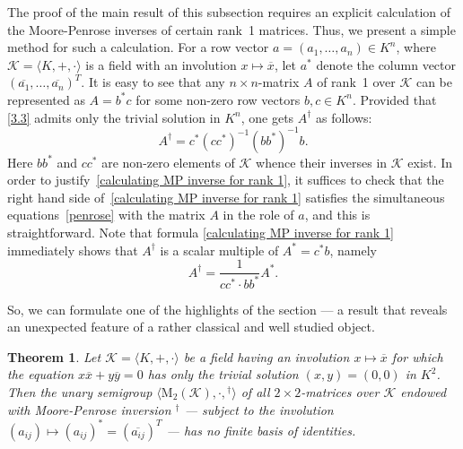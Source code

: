\documentclass[11pt,reqno]{amsart}
\numberwithin{equation}{section}
\newtheorem{Thm}{Theorem}[section]
\theoremstyle{remark}
\def\ol{\overline}
\begin{document}
The proof of the main result of this subsection requires an
explicit calculation of the Moore-Penrose inverses of certain
rank~1 matrices. Thus, we present a simple method for such a
calculation. For a row vector $a=(a_1,\dots,a_n)\in K^n$, where
$\mathcal{K}=\langle K,+,\cdot\rangle$ is a field with an
involution $x\mapsto\ol x$, let $a^*$ denote the column vector
$(\ol{a_1},\dots,\ol{a_n})^T$. It is easy to see that any $n\times
n$-matrix $A$ of rank~1 over $\mathcal{K}$ can be represented as
$A=b^*c$ for some non-zero row vectors $b,c\in K^n$. Provided that
\eqref{3.3} admits only the trivial solution in $K^n$, one gets
$A^\dag$ as follows:
\begin{equation}
\label{calculating MP inverse for rank 1}
A^\dag=c^*(cc^*)^{-1}(bb^*)^{-1}b.
\end{equation}
Here $bb^*$ and $cc^*$ are non-zero elements of $\mathcal{K}$
whence their inverses in $\mathcal{K}$ exist. In order to
justify~\eqref{calculating MP inverse for rank 1}, it suffices to
check that the right hand side of~\eqref{calculating MP inverse
for rank 1} satisfies the simultaneous equations~\eqref{penrose}
with the matrix $A$ in the role of $a$, and this is
straightforward. Note that formula \eqref{calculating MP inverse
for rank 1} immediately shows that $A^\dag$ is a scalar multiple
of $A^*=c^*b$, namely
\begin{equation}\label{MP is scalar multiple}
A^\dag=\frac{1}{cc^*\cdot bb^*}A^*.
\end{equation}

So, we can formulate one of the highlights of the section --- a
result that reveals an unexpected feature of a rather classical
and well studied object.
\begin{Thm} \label{Theorem 3.5}
Let $\mathcal{K}=\langle K,+,\cdot\rangle$ be a field having an
involution $x\mapsto \ol x$ for which the equation $x\ol x +y\ol y
=0$ has only the trivial solution $(x,y)=(0,0)$ in $K^2$. Then the
unary semigroup
$\langle\mathrm{M}_2(\mathcal{K}),\cdot,{}^\dag\rangle$ of all
$2\times 2$-matrices over $\mathcal{K}$ endowed with Moore-Penrose
inversion $^\dag$ --- subject to the involution $(a_{ij})\mapsto
(a_{ij})^*= (\ol{a_{ij}})^T$
--- has no finite basis of identities.
\end{Thm}
\end{document}
